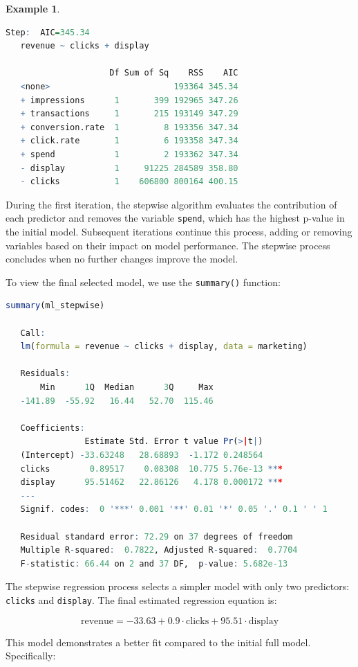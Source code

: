 \documentclass[
]{book}
\newcommand{\passthrough}[1]{#1}
\theoremstyle{definition}
\theoremstyle{definition}
\newtheorem{example}{Example}[chapter]
\theoremstyle{definition}
\theoremstyle{definition}
\theoremstyle{remark}
\begin{document}
\begin{example}
\begin{lstlisting}[language=R]
   Step:  AIC=345.34
   revenue ~ clicks + display
   
                     Df Sum of Sq    RSS    AIC
   <none>                         193364 345.34
   + impressions      1       399 192965 347.26
   + transactions     1       215 193149 347.29
   + conversion.rate  1         8 193356 347.34
   + click.rate       1         6 193358 347.34
   + spend            1         2 193362 347.34
   - display          1     91225 284589 358.80
   - clicks           1    606800 800164 400.15
\end{lstlisting}

During the first iteration, the stepwise algorithm evaluates the contribution of each predictor and removes the variable \passthrough{\lstinline!spend!}, which has the highest p-value in the initial model. Subsequent iterations continue this process, adding or removing variables based on their impact on model performance. The stepwise process concludes when no further changes improve the model.

To view the final selected model, we use the \passthrough{\lstinline!summary()!} function:

\begin{lstlisting}[language=R]
summary(ml_stepwise)
   
   Call:
   lm(formula = revenue ~ clicks + display, data = marketing)
   
   Residuals:
       Min      1Q  Median      3Q     Max 
   -141.89  -55.92   16.44   52.70  115.46 
   
   Coefficients:
                Estimate Std. Error t value Pr(>|t|)    
   (Intercept) -33.63248   28.68893  -1.172 0.248564    
   clicks        0.89517    0.08308  10.775 5.76e-13 ***
   display      95.51462   22.86126   4.178 0.000172 ***
   ---
   Signif. codes:  0 '***' 0.001 '**' 0.01 '*' 0.05 '.' 0.1 ' ' 1
   
   Residual standard error: 72.29 on 37 degrees of freedom
   Multiple R-squared:  0.7822, Adjusted R-squared:  0.7704 
   F-statistic: 66.44 on 2 and 37 DF,  p-value: 5.682e-13
\end{lstlisting}

The stepwise regression process selects a simpler model with only two predictors: \passthrough{\lstinline!clicks!} and \passthrough{\lstinline!display!}. The final estimated regression equation is:

\[
\text{revenue} = -33.63 + 0.9 \cdot \text{clicks} + 95.51 \cdot \text{display}
\]

This model demonstrates a better fit compared to the initial full model. Specifically:


\end{example}
\end{document}
